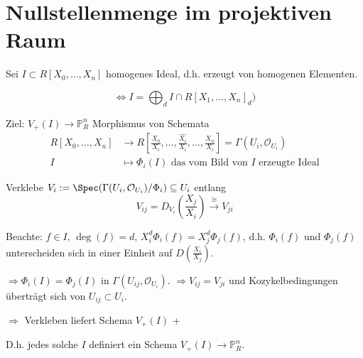 \section{Nullstellenmenge im projektiven Raum }

Sei $I\subset R[X_{0},\ldots,X_{n}]$ homogenes Ideal, d.h. erzeugt
von homogenen Elementen.

\[
  \Leftrightarrow I=\bigoplus_{d}I\cap R[X_{1},\ldots,X_{n}]_{d})
\]

Ziel: $V_{+}(I)\rightarrow\mathbb{P}_{R}^{n}$ Morphismus von Schemata
\begin{align*}
  R[X_{0},\ldots,X_{n}] & \longrightarrow R\left[\frac{X_{0}}{X_{i}},\ldots,\frac{\hat{X_{i}}}{X_{i}},\ldots,\frac{X_{n}}{X_{i}}\right]=\Gamma(U_{i},\mathcal{O}_{U_{i}})\\
  I & \longmapsto\Phi_{i}(I)\text{ das vom Bild von }I\text{ erzeugte Ideal}
\end{align*}

Verklebe $V_{i}:=\Spec(\Gamma(U_{i},\mathcal{O}_{U_{i}})/\Phi_{i})\subseteq U_{i}$
entlang
\[
  V_{ij}=D_{V_{i}}\left(\frac{X_{j}}{X_{i}}\right)\xrightarrow{\cong}V_{ji}
\]

Beachte: $f\in I$, $\deg(f)=d$, $X_{i}^{d}\Phi_{i}(f)=X_{j}^{d}\Phi_{j}(f)$,
d.h. $\Phi_{i}(f)$ und $\Phi_{j}(f)$ unterscheiden sich in einer
Einheit auf $D\left(\frac{X_{i}}{X_{j}}\right)$.

$\Longrightarrow\Phi_{i}(I)=\Phi_{j}(I)$ in $\Gamma(U_{ij},\mathcal{O}_{U_{i}})$.
$\Longrightarrow V_{ij}=V_{ji}$ und Kozykelbedingungen überträgt
sich von $U_{ij}\subset U_{i}$.

$\Longrightarrow$ Verkleben liefert Schema $V_{+}(I)$ + 

D.h. jedes solche $I$ definiert ein Schema $V_{+}(I)\rightarrow\mathbb{P}_{R}^{n}$.
